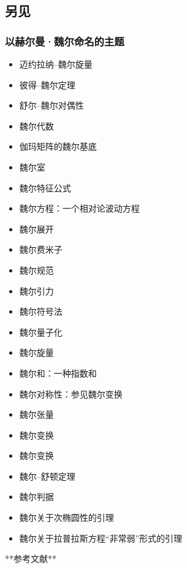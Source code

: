 \subsection{另见} 
\subsubsection{以赫尔曼·魏尔命名的主题}  
\begin{itemize}
\item 迈约拉纳–魏尔旋量  
\item 彼得–魏尔定理  
\item 舒尔–魏尔对偶性  
\item 魏尔代数  
\item 伽玛矩阵的魏尔基底  
\item 魏尔室  
\item 魏尔特征公式  
\item 魏尔方程：一个相对论波动方程  
\item 魏尔展开  
\item 魏尔费米子  
\item 魏尔规范  
\item 魏尔引力  
\item 魏尔符号法  
\item 魏尔量子化  
\item 魏尔旋量  
\item 魏尔和：一种指数和  
\item 魏尔对称性：参见魏尔变换  
\item 魏尔张量  
\item 魏尔变换  
\item 魏尔变换  
\item 魏尔–舒顿定理  
\item 魏尔判据  
\item 魏尔关于次椭圆性的引理  
\item 魏尔关于拉普拉斯方程“非常弱”形式的引理  
\end{itemize}

**参考文献**  

